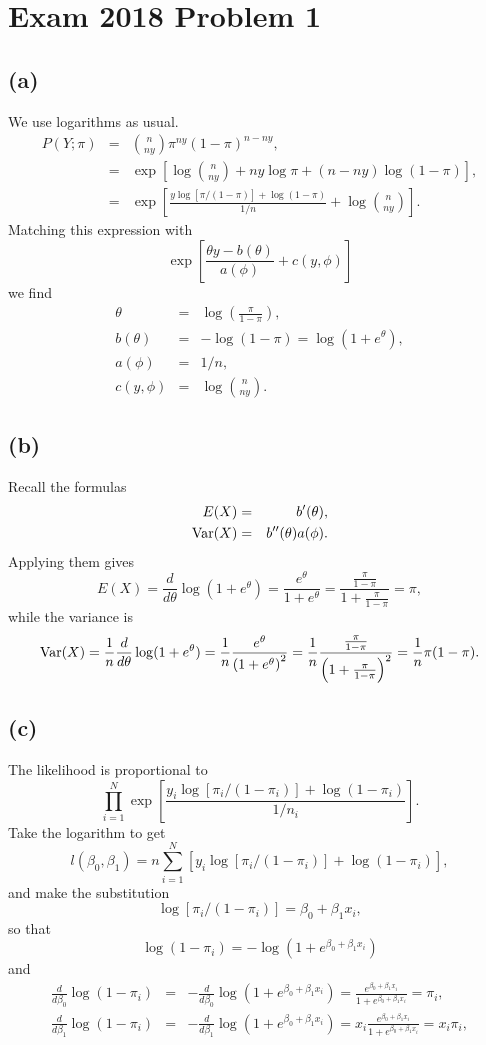 \section*{Exam 2018 Problem 1}

\subsection*{(a)}
We use logarithms as usual.
\begin{eqnarray*}
P(Y;\pi) & = & {n \choose ny}\pi^{ny}(1-\pi)^{n-ny},\\
 & = & \exp\left[\log{n \choose ny}+ny\log\pi+(n-ny)\log(1-\pi)\right],\\
 & = & \exp\left[\frac{y\log[\pi/(1-\pi)]+\log(1-\pi)}{1/n}+\log{n \choose ny}\right].
\end{eqnarray*}
Matching this expression with 
\[
\exp\left[\frac{\theta y-b(\theta)}{a(\phi)}+c(y,\phi)\right]
\]
we find
\begin{eqnarray*}
\theta & = & \log\left(\frac{\pi}{1-\pi}\right),\\
b(\theta) & = & -\log(1-\pi)=\log(1+e^{\theta}),\\
a(\phi) & = & 1/n,\\
c(y,\phi) & = & \log{n \choose ny}.
\end{eqnarray*}
\subsection*{(b)}
Recall the formulas
\begin{eqnarray*}
E(X) & = & b'(\theta),\\
\mathrm{Var}(X) & = & b''(\theta)a(\phi).
\end{eqnarray*}
Applying them gives
\[
E(X)=\frac{d}{d\theta}\log(1+e^{\theta})=\frac{e^{\theta}}{1+e^{\theta}}=\frac{\frac{\pi}{1-\pi}}{1+\frac{\pi}{1-\pi}}=\pi,
\]
while the variance is
\[
\mathrm{Var}(X)=\frac{1}{n}\frac{d}{d\theta}\log(1+e^{\theta})=\frac{1}{n}\frac{e^{\theta}}{\left(1+e^{\theta}\right)^{2}}=\frac{1}{n}\frac{\frac{\pi}{1-\pi}}{\left(1+\frac{\pi}{1-\pi}\right)^{2}}=\frac{1}{n}\pi(1-\pi).
\]
\subsection*{(c)}
The likelihood is proportional to
\[
\prod_{i=1}^{N}\exp\left[\frac{y_{i}\log[\pi_{i}/(1-\pi_{i})]+\log(1-\pi_{i})}{1/n_{i}}\right].
\]
Take the logarithm to get
\[
l(\beta_{0},\beta_{1})=n\sum_{i=1}^{N}\left[y_{i}\log[\pi_{i}/(1-\pi_{i})]+\log(1-\pi_{i})\right],
\]
and make the substitution 
\[
\log[\pi_{i}/(1-\pi_{i})]=\beta_{0}+\beta_{1}x_{i},
\]
so that
\[
\log(1-\pi_{i})=-\log(1+e^{\beta_{0}+\beta_{1}x_{i}})
\]
and
\begin{eqnarray*}
\frac{d}{d\beta_{0}}\log(1-\pi_{i}) & = & -\frac{d}{d\beta_{0}}\log(1+e^{\beta_{0}+\beta_{1}x_{i}})=\frac{e^{\beta_{0}+\beta_{1}x_{i}}}{1+e^{\beta_{0}+\beta_{1}x_{i}}}=\pi_{i},\\
\frac{d}{d\beta_{1}}\log(1-\pi_{i}) & = & -\frac{d}{d\beta_{1}}\log(1+e^{\beta_{0}+\beta_{1}x_{i}})=x_{i}\frac{e^{\beta_{0}+\beta_{1}x_{i}}}{1+e^{\beta_{0}+\beta_{1}x_{i}}}=x_{i}\pi_{i},
\end{eqnarray*}


